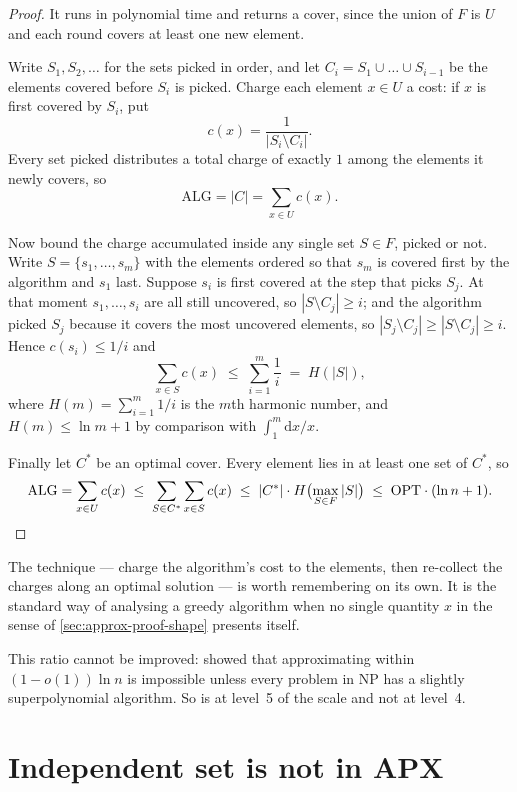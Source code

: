 \begin{proof}
It runs in polynomial time and returns a cover, since the union of $F$ is $U$
and each round covers at least one new element.

Write $S_1, S_2, \dots$ for the sets picked in order, and let
$C_i = S_1 \cup \dots \cup S_{i-1}$ be the elements covered before $S_i$ is
picked. Charge each element $x \in U$ a cost: if $x$ is first covered by $S_i$,
put
\[ c(x) = \frac{1}{|S_i \setminus C_i|}. \]
Every set picked distributes a total charge of exactly $1$ among the elements it
newly covers, so
\[ \mathrm{ALG} = |C| = \sum_{x \in U} c(x). \]

Now bound the charge accumulated inside any single set $S \in F$, picked or not.
Write $S = \{s_1, \dots, s_m\}$ with the elements ordered so that $s_m$ is
covered first by the algorithm and $s_1$ last. Suppose $s_i$ is first covered at
the step that picks $S_j$. At that moment $s_1, \dots, s_i$ are all still
uncovered, so $|S \setminus C_j| \ge i$; and the algorithm picked $S_j$ because
it covers the most uncovered elements, so
$|S_j \setminus C_j| \ge |S \setminus C_j| \ge i$. Hence $c(s_i) \le 1/i$ and
\[ \sum_{x \in S} c(x) \;\le\; \sum_{i=1}^{m} \frac{1}{i} \;=\; H(|S|), \]
where $H(m) = \sum_{i=1}^m 1/i$ is the $m$th harmonic number, and
$H(m) \le \ln m + 1$ by comparison with $\int_1^m \mathrm{d}x/x$.

Finally let $C^{*}$ be an optimal cover. Every element lies in at least one set
of $C^{*}$, so
\[ \mathrm{ALG} = \sum_{x \in U} c(x)
   \;\le\; \sum_{S \in C^{*}} \sum_{x \in S} c(x)
   \;\le\; |C^{*}| \cdot H\bigl(\max_{S \in F} |S|\bigr)
   \;\le\; \mathrm{OPT} \cdot (\ln n + 1). \qedhere \]
\end{proof}

The technique --- charge the algorithm's cost to the elements, then re-collect
the charges along an optimal solution --- is worth remembering on its own. It is
the standard way of analysing a greedy algorithm when no single quantity $x$ in
the sense of \cref{sec:approx-proof-shape} presents itself.

This ratio cannot be improved: \citet{Feige1998} showed that approximating
 within $(1-o(1))\ln n$ is impossible unless every problem in
\textrm{NP} has a slightly superpolynomial algorithm. So  is at
level~5 of the scale and not at level~4.

\section{Independent set is not in APX}
\label{sec:is-not-apx}

